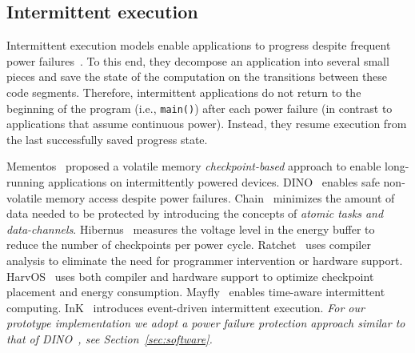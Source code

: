 \subsection{Intermittent execution}
Intermittent execution models enable applications to progress despite frequent power failures~\cite{van2016intermittent,colin2016chain,lucia2015simpler,bhatti2017harvos,gobieski2019intelligence}. To this end, they decompose an application into several small pieces and save the state of the computation on the transitions between these code segments. Therefore, intermittent applications do not return to the beginning of the program (i.e., \texttt{main()}) after each power failure (in contrast to  applications that assume continuous power). Instead, they resume execution from the last successfully saved progress state.   


Mementos~\cite{ransford2011mementos} proposed a volatile memory \emph{checkpoint-based} approach to enable long-running applications on intermittently powered devices. DINO~\cite{dino} enables safe non-volatile memory access despite power failures. Chain~\cite{colin2016chain} minimizes the amount of data needed to be protected by introducing the concepts of \emph{atomic tasks and data-channels}. Hibernus~\cite{balsamo2014hibernus,balsamo2016hibernus++} measures the voltage level in the energy buffer to reduce the number of checkpoints per power cycle. Ratchet~\cite{van2016intermittent} uses compiler analysis to eliminate the need for programmer intervention or hardware support. HarvOS~\cite{bhatti2017harvos} uses both compiler and hardware support to optimize checkpoint placement and energy consumption. Mayfly~\cite{hester2017timely} enables time-aware intermittent computing. InK~\cite{yildirim2018ink} introduces event-driven intermittent execution.  
\emph{For our prototype implementation we adopt a power failure protection approach similar to that of DINO~\cite{dino}, see Section~\ref{sec:software}.}


